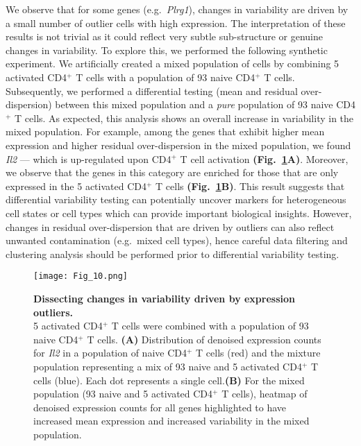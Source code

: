 We observe that for some genes (e.g.~\textit{Plrg1}), changes in variability are driven by a small number of outlier cells with high expression. The interpretation of these results is not trivial as it could reflect very subtle sub-structure or genuine changes in variability. To explore this, we performed the following synthetic experiment. We artificially created a mixed population of cells by combining 5 activated CD4$^+$ T cells with a population of 93 naive CD4$^+$ T cells. Subsequently, we performed a differential testing (mean and residual over-dispersion) between this mixed population and a \textit{pure} population of 93 naive CD4$^+$ T cells. As expected, this analysis shows an overall increase in variability in the mixed population. For example, among the genes that exhibit higher mean expression and higher residual over-dispersion in the mixed population, we found \textit{Il2} --- which is up-regulated upon CD4$^+$ T cell activation \textbf{(Fig.~\ref{fig2:mixture_population}A)}. Moreover, we observe that the genes in this category are enriched for those that are only expressed in the 5 activated CD4$^+$ T cells \textbf{(Fig.~\ref{fig2:mixture_population}B)}. This result suggests that differential variability testing can potentially uncover markers for heterogeneous cell states or cell types which can provide important biological insights. However, changes in residual over-dispersion that are driven by outliers can also reflect unwanted contamination 
(e.g.~mixed cell types), hence careful data filtering and clustering analysis should be performed prior to differential variability testing. 

\newpage

\begin{figure}[!h]
\centering
\texttt{[image: Fig\_10.png]}
\caption{\textbf{Dissecting changes in variability driven by expression outliers.}\\
5 activated CD4$^+$ T cells were combined with a population of 93 naive CD4$^+$ T cells. \textbf{(A)} Distribution of denoised expression counts for \textit{Il2} in a population of naive CD4$^+$ T cells (red) and the mixture population representing a mix of 93 naive and 5 activated CD4$^+$ T cells (blue). Each dot represents a single cell.\textbf{(B)} For the mixed population (93 naive and 5 activated CD4$^+$ T cells), heatmap of denoised expression counts for all genes highlighted to have increased mean expression and increased variability in the mixed population.}
\label{fig2:mixture_population}
\end{figure}


